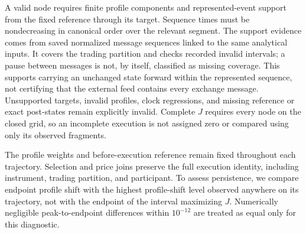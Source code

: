 A valid node requires finite profile components and represented-event support from the fixed reference through its target. Sequence times must be nondecreasing in canonical order over the relevant segment. The support evidence comes from saved normalized message sequences linked to the same analytical inputs. It covers the trading partition and checks recorded invalid intervals; a pause between messages is not, by itself, classified as missing coverage. This supports carrying an unchanged state forward within the represented sequence, not certifying that the external feed contains every exchange message. Unsupported targets, invalid profiles, clock regressions, and missing reference or exact post-states remain explicitly invalid. Complete $J$ requires every node on the closed grid, so an incomplete execution is not assigned zero or compared using only its observed fragments.

The profile weights and before-execution reference remain fixed throughout each trajectory. Selection and price joins preserve the full execution identity, including instrument, trading partition, and participant. To assess persistence, we compare endpoint profile shift with the highest profile-shift level observed anywhere on its trajectory, not with the endpoint of the interval maximizing $J$. Numerically negligible peak-to-endpoint differences within $10^{-12}$ are treated as equal only for this diagnostic.

